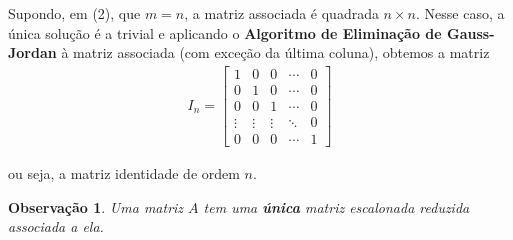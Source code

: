 \documentclass{article}
\newtheorem*{remark}{Observação}
\begin{document}
\par\vspace{0.3cm} Supondo, em (2), que $m=n$, a matriz associada é quadrada $n\times n$. Nesse caso, a única solução é a trivial e aplicando o \textbf{Algoritmo de Eliminação de Gauss-Jordan} à matriz associada (com exceção da última coluna), obtemos a matriz
\begin{align*}
I_n = \begin{bmatrix}
1 & 0 & 0 &\cdots & 0 \\
0 & 1 & 0 &\cdots & 0 \\
0 & 0 & 1 & \cdots & 0 \\
\vdots & \vdots & \vdots & \ddots & 0 \\
0 & 0 & 0 &\cdots & 1 
\end{bmatrix}
\end{align*} 
\par\vspace{0.3cm} ou seja, a matriz identidade de ordem $n$.

\begin{remark}
	Uma matriz $A$ tem uma \textbf{única} matriz escalonada reduzida associada a ela.
\end{remark}
\end{document}
